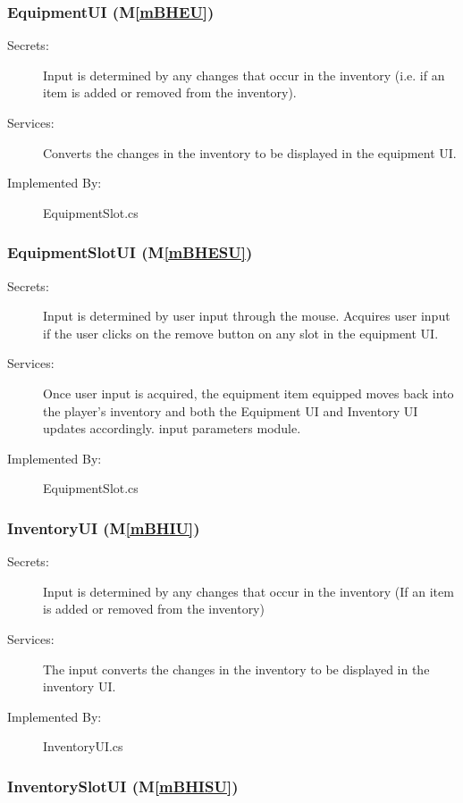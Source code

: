 \documentclass[12pt, titlepage]{article}
\newcommand{\mref}[1]{M\ref{#1}}
\begin{document}
\subsubsection{EquipmentUI (\mref{mBHEU})}

\begin{description}
\item[Secrets:] Input is determined by any changes that occur in the inventory (i.e. if an item is added or removed from the inventory).
\item[Services:] Converts the changes in the inventory to be displayed in the equipment UI.
\item[Implemented By:] EquipmentSlot.cs
\end{description}

\subsubsection{EquipmentSlotUI (\mref{mBHESU})}

\begin{description}
\item[Secrets:] Input is determined by user input through the mouse. Acquires user input if the user clicks on the remove button on any slot in the equipment UI.
\item[Services:] Once user input is acquired, the equipment item equipped moves back into the player's inventory and both the Equipment UI and Inventory UI updates accordingly.
  input parameters module.
\item[Implemented By:] EquipmentSlot.cs
\end{description}

\subsubsection{InventoryUI (\mref{mBHIU})}

\begin{description}
\item[Secrets:] Input is determined by any changes that occur in the inventory (If an item is added or removed from the inventory) 
\item[Services:] The input converts the changes in the inventory to be displayed in the inventory UI.
\item[Implemented By:] InventoryUI.cs
\end{description}

\subsubsection{InventorySlotUI (\mref{mBHISU})}
\end{document}
